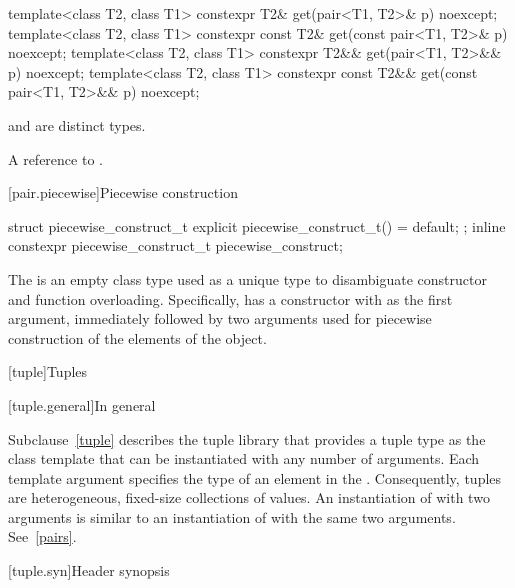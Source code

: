 %
\begin{itemdecl}
template<class T2, class T1>
  constexpr T2& get(pair<T1, T2>& p) noexcept;
template<class T2, class T1>
  constexpr const T2& get(const pair<T1, T2>& p) noexcept;
template<class T2, class T1>
  constexpr T2&& get(pair<T1, T2>&& p) noexcept;
template<class T2, class T1>
  constexpr const T2&& get(const pair<T1, T2>&& p) noexcept;
\end{itemdecl}

\begin{itemdescr}
\pnum
\mandates
{} and  are distinct types.

\pnum
\returns
A reference to .
\end{itemdescr}

[pair.piecewise]{Piecewise construction}

%
%
\begin{itemdecl}
struct piecewise_construct_t {
  explicit piecewise_construct_t() = default;
};
inline constexpr piecewise_construct_t piecewise_construct{};
\end{itemdecl}

\pnum
The   is an empty class type
used as a unique type to disambiguate constructor and function overloading. Specifically,
 has a constructor with  as the
first argument, immediately followed by two  arguments used
for piecewise construction of the elements of the  object.

[tuple]{Tuples}

[tuple.general]{In general}

\pnum
{}%
Subclause~\ref{tuple} describes the tuple library that provides a tuple type as
the class template  that can be instantiated with any number
of arguments. Each template argument specifies
the type of an element in the .  Consequently, tuples are
heterogeneous, fixed-size collections of values. An instantiation of  with
two arguments is similar to an instantiation of  with the same two arguments.
See~\ref{pairs}.

[tuple.syn]{Header  synopsis}

